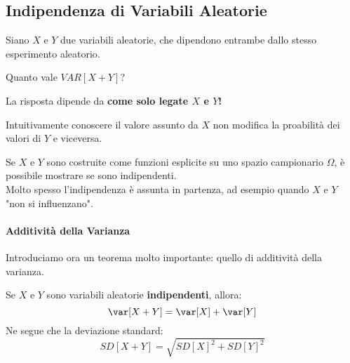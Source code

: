\subsection{Indipendenza di Variabili Aleatorie}
Siano $X$ e $Y$ due variabili aleatorie, che dipendono entrambe dallo 
stesso esperimento aleatorio. 
\begin{center}
    Quanto vale $VAR[X+Y]$?
\end{center}
La risposta dipende da \textbf{come solo legate $X$ e $Y$!}

Intuitivamente conoscere il valore assunto da $X$ non modifica la proabilità dei valori
di $Y$ e viceversa.

Se $X$ e $Y$ sono costruite come funzioni esplicite su uno spazio campionario $\Omega$, 
è possibile mostrare se sono indipendenti.
\\ Molto spesso l'indipendenza è assunta in partenza, ad esempio quando $X$ e $Y$ "non si influenzano". 

\paragraph{Additività della Varianza}
Introduciamo ora un teorema molto importante: quello di additività della varianza.

Se $X$ e $Y$ sono variabili aleatorie \textbf{indipendenti}, allora:
\[
    \var[X+Y] = \var[X] + \var[Y]
\]
Ne segue che la deviazione standard:
\[
    SD[X+Y] = \sqrt{SD[X]^2 + SD[Y]^2}  
\]



